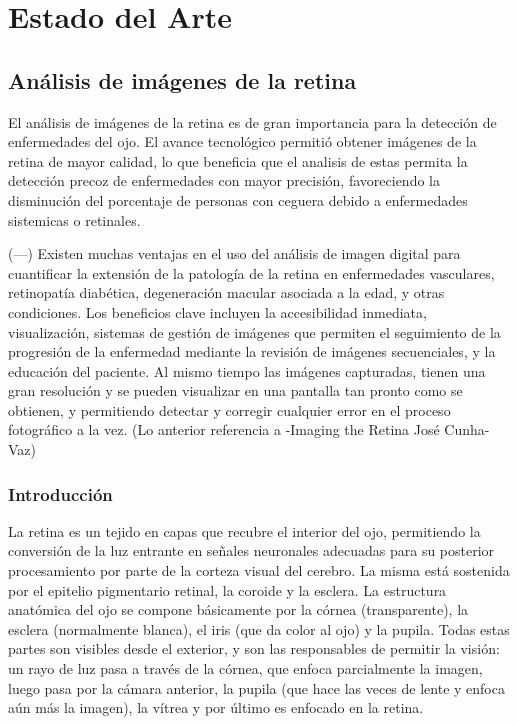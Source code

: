 \chapter{Estado del Arte} %

\label{Chapter2} %


\section{An\'alisis de im\'agenes de la retina}

El an\'alisis de im\'agenes de la retina es de gran importancia para la detecci\'on de enfermedades del ojo.
El avance tecnol\'ogico permiti\'o obtener im\'agenes de la retina de mayor calidad, lo que beneficia que el analisis de estas permita la detecci\'on precoz de enfermedades con mayor precisi\'on, favoreciendo la disminuci\'on del porcentaje de personas con ceguera debido a enfermedades sistemicas o retinales. 

(---)
Existen muchas ventajas en el uso del an\'alisis de imagen digital para cuantificar la extensi\'on de la patolog\'ia de la retina en enfermedades vasculares, retinopat\'ia diab\'etica, degeneraci\'on macular asociada a la edad, y otras condiciones. Los beneficios clave incluyen la accesibilidad inmediata, visualizaci\'on, sistemas de gesti\'on de im\'agenes que permiten el seguimiento de la progresi\'on de la enfermedad mediante la revisi\'on de im\'agenes secuenciales, y la educaci\'on del paciente. Al mismo tiempo las im\'agenes capturadas, tienen una  gran resoluci\'on y se pueden visualizar en una pantalla tan pronto como se obtienen, y  permitiendo detectar y corregir cualquier error en el proceso fotogr\'afico a la vez.
(Lo anterior referencia a -Imaging the Retina  José Cunha- Vaz)

\subsection{Introducci\'on}

La retina es un tejido en capas que recubre el interior del ojo, permitiendo la conversión de la luz entrante en señales neuronales adecuadas para su posterior procesamiento por parte de la corteza visual del cerebro. La misma está sostenida por el epitelio pigmentario retinal, la coroide y la esclera.
La estructura anatómica del ojo se compone básicamente por la córnea (transparente), la esclera (normalmente blanca), el iris (que da color al ojo) y la pupila. Todas estas partes son visibles desde el exterior, y son las responsables de permitir la visión: un rayo de luz pasa a través de la córnea, que enfoca parcialmente la imagen, luego pasa por la cámara anterior, la pupila (que hace las veces de lente y enfoca aún más la imagen), la vítrea y por último es enfocado en la retina.

